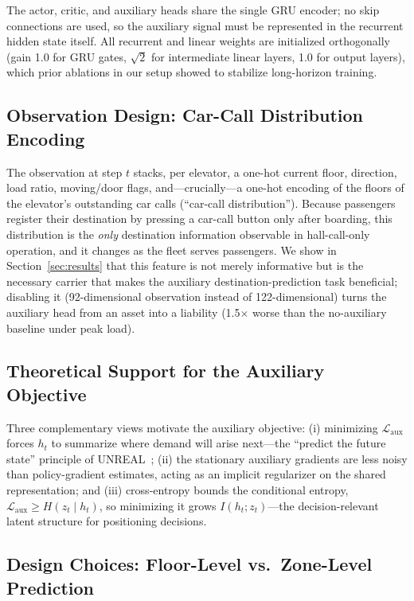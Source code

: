 \documentclass{IEEEcsmag}
\begin{document}
The actor, critic, and auxiliary heads share the single GRU encoder;
no skip connections are used, so the auxiliary signal must be
represented in the recurrent hidden state itself. All recurrent and
linear weights are initialized orthogonally (gain 1.0 for GRU gates,
$\sqrt{2}$ for intermediate linear layers, 1.0 for output layers),
which prior ablations in our setup showed to stabilize long-horizon
training.

\subsection{Observation Design: Car-Call Distribution Encoding}

The observation at step $t$ stacks, per elevator, a one-hot current
floor, direction, load ratio, moving/door flags, and---crucially---a
one-hot encoding of the floors of the elevator's outstanding car
calls (``car-call distribution''). Because passengers register their
destination by pressing a car-call button only after boarding, this
distribution is the \emph{only} destination information observable
in hall-call-only operation, and it changes as the fleet serves
passengers. We show in Section~\ref{sec:results} that this feature
is not merely informative but is the necessary carrier that makes
the auxiliary destination-prediction task beneficial; disabling it
(92-dimensional observation instead of 122-dimensional) turns the
auxiliary head from an asset into a liability (1.5$\times$ worse
than the no-auxiliary baseline under peak load).

\subsection{Theoretical Support for the Auxiliary Objective}

Three complementary views motivate the auxiliary objective: (i)
minimizing $\mathcal{L}_{\text{aux}}$ forces $h_t$ to summarize
where demand will arise next---the ``predict the future state''
principle of UNREAL~\cite{jaderberg2017unreal}; (ii) the stationary
auxiliary gradients are less noisy than policy-gradient estimates,
acting as an implicit regularizer on the shared representation; and
(iii) cross-entropy bounds the conditional entropy,
$\mathcal{L}_{\text{aux}} \geq H(z_t\mid h_t)$, so minimizing it
grows $I(h_t; z_t)$---the decision-relevant latent structure for
positioning decisions.
\subsection{Design Choices: Floor-Level vs.\ Zone-Level Prediction}
\end{document}
